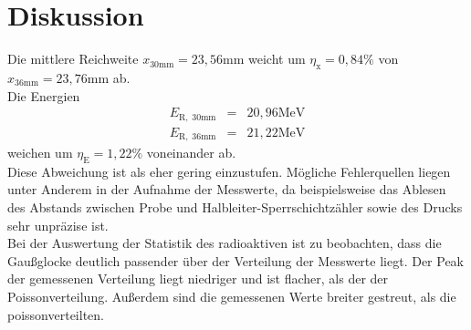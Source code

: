 \section{Diskussion}
\label{sec:Diskussion}


Die mittlere Reichweite $x_{\mathrm{30mm}} = 23,56 \mathrm{mm}$ weicht um 
$\eta_{\mathrm{x}} = 0,84 \%$ von $x_{\mathrm{36mm}} = 23,76 \mathrm{mm}$ ab.\\

Die Energien
\begin{eqnarray}
    E_{\mathrm{R, \; 30mm}} &=& 20,96  \mathrm{MeV}  \nonumber \\
    E_{\mathrm{R, \; 36mm}} &=& 21,22  \mathrm{MeV}  \nonumber
\end{eqnarray}
weichen um $\eta_{\mathrm{E}} = 1,22 \%$ voneinander ab.\\
Diese Abweichung ist als eher gering einzustufen.
Mögliche Fehlerquellen liegen unter Anderem in der Aufnahme der Messwerte, 
da beispielsweise das Ablesen des Abstands zwischen Probe und Halbleiter-Sperrschichtzähler sowie des Drucks sehr unpräzise ist.\\
Bei der Auswertung der Statistik des radioaktiven ist zu beobachten, dass die 
Gaußglocke deutlich passender über der Verteilung der Messwerte liegt. 
Der Peak der gemessenen Verteilung liegt niedriger und ist flacher, als der der Poissonverteilung.
Außerdem sind die gemessenen Werte breiter gestreut, als die poissonverteilten.\\